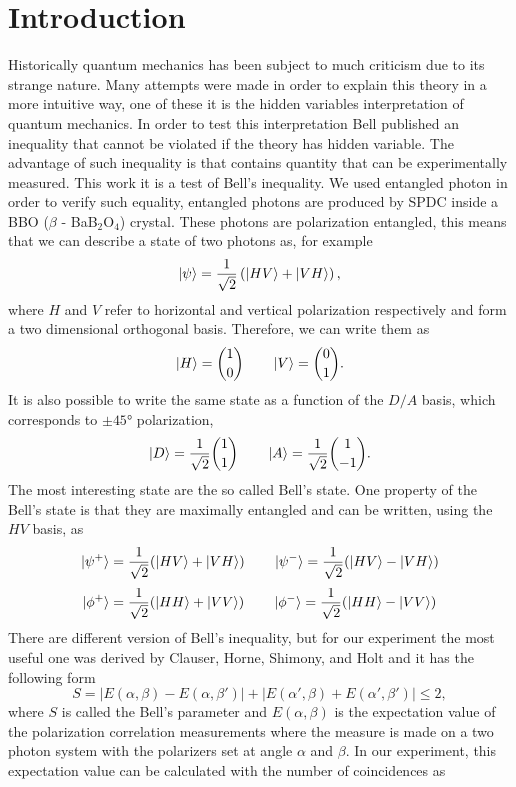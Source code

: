 \documentclass[a4paper,10pt]{article}
\begin{document}
\section{Introduction}
Historically quantum mechanics has been subject to much criticism due to its strange nature. Many attempts were made in order to explain this theory in a more intuitive way, one of these it is the hidden variables interpretation of quantum mechanics. In order to test this interpretation Bell published an inequality \cite{bellpaper} that cannot be violated if the theory has hidden variable. The advantage of such inequality is that contains quantity that can be experimentally measured. This work it is a test of Bell's inequality. We used entangled photon in order to verify such equality, entangled photons are produced by SPDC inside a BBO ($\beta$ - BaB$_2$O$_4$) crystal. These photons are polarization entangled, this means that we can describe a state of two photons as, for example
\begin{equation}\ket{\psi} = \frac{1}{\sqrt{2}}\left(\ket{HV} + \ket{VH}\right),\end{equation}
where $H$ and $V$ refer to horizontal and vertical polarization respectively and form a two dimensional orthogonal basis. Therefore, we can write them as
\[\ket{H} = \binom{1}{0} \qquad \ket{V} = \binom{0}{1}.\]
It is also possible to write the same state as a function of the $D/A$ basis, which corresponds to $\pm 45$° polarization,
\begin{equation}\ket{D} = \frac{1}{\sqrt{2}} \binom{1}{1} \qquad \ket{A} = \frac{1}{\sqrt{2}}\binom{1}{-1}.\end{equation}
The most interesting state are the so called Bell's state. One property of the Bell's state is that they are maximally entangled and can be written, using the $HV$ basis, as
\[\ket{\psi^+} = \frac{1}{\sqrt{2}}(\ket{HV} + \ket{VH}) \qquad \ket{\psi^-} = \frac{1}{\sqrt{2}}(\ket{HV} - \ket{VH})\]
\[\ket{\phi^+} = \frac{1}{\sqrt{2}}(\ket{HH} + \ket{VV}) \qquad \ket{\phi^-} = \frac{1}{\sqrt{2}}(\ket{HH} - \ket{VV})\]
There are different version of Bell's inequality, but for our experiment the most useful one was derived by Clauser, Horne, Shimony, and Holt \cite{inequality} and it has the following form
\begin{equation}\label{Bellinequalityi}S = |E(\alpha,\beta)-E(\alpha,\beta')|+|E(\alpha',\beta)+E(\alpha',\beta')|\leq 2,\end{equation}
where $S$ is called the Bell's parameter and $E(\alpha,\beta)$ is the expectation value of the polarization correlation measurements where the measure is made on a two photon system with the polarizers set at angle $\alpha$ and $\beta.$ In our experiment, this expectation value can be calculated with the number of coincidences as
\end{document}
